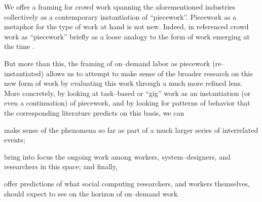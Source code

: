 \documentclass[trackingWork]{subfiles}
\begin{document}

We offer a framing for crowd work spanning the aforementioned industries
collectively as a contemporary instantiation of ``piecework''.
Piecework as a metaphor for the type of work at hand is not new.
Indeed,
\citeauthor{crowdworkFuture}
in
\citeauthor{crowdworkFuture}
referenced crowd work as ``piecework'' briefly
as a loose analogy to the form of work emerging at the time
\cite{crowdworkFuture}.


But more than this,
the framing of on--demand labor as piecework (re--instantiated)
allows us to attempt to make sense of the broader research on this new form of work
by evaluating this work through a much more refined lens.
More concretely, by looking at task--based or ``gig'' work as
an instantiation (or even a continuation) of piecework,
and by looking for patterns of behavior that the corresponding literature predicts
on this basis, we can
\begin{inlinelist}
  \item make sense of the phenomena so far as part of a much larger series of interrelated events;
  \item bring into focus the ongoing work among workers, system--designers, and researchers in this space; and finally,
  \item offer predictions of what social computing researchers,
        and workers themselves,
        should expect to see on the horizon of on--demand work.
\end{inlinelist}
\end{document}
